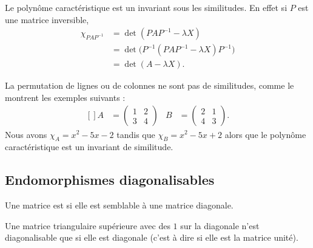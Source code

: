 Le polynôme caractéristique est un invariant sous les similitudes. En effet si \( P\) est une matrice inversible,
\begin{subequations}
    \begin{align}
        \chi_{PAP^{-1}}&=\det(PAP^{-1}-\lambda X)\\
        &=\det\big( P^{-1}(PAP^{-1}-\lambda X)P^{-1} \big)\\
        &=\det(A-\lambda X).
    \end{align}
\end{subequations}

La permutation de lignes ou de colonnes ne sont pas de similitudes, comme le montrent les exemples suivants :
\begin{equation}
    \begin{aligned}[]
        A&=\begin{pmatrix}
            1    &   2    \\ 
            3    &   4    
        \end{pmatrix}&
        B&=\begin{pmatrix}
            2    &   1    \\ 
            4    &   3    
        \end{pmatrix}.
    \end{aligned}
\end{equation}
Nous avons \( \chi_A=x^2-5x-2\) tandis que \( \chi_B=x^2-5x+2\) alors que le polynôme caractéristique est un invariant de similitude.

\subsection{Endomorphismes diagonalisables}

\begin{definition}  \label{DefCNJqsmo}
    Une matrice est  si elle est semblable à une matrice diagonale.
\end{definition}

\begin{lemma}
    Une matrice triangulaire supérieure avec des \( 1\) sur la diagonale n'est diagonalisable que si elle est diagonale (c'est à dire si elle est la matrice unité).
\end{lemma}

